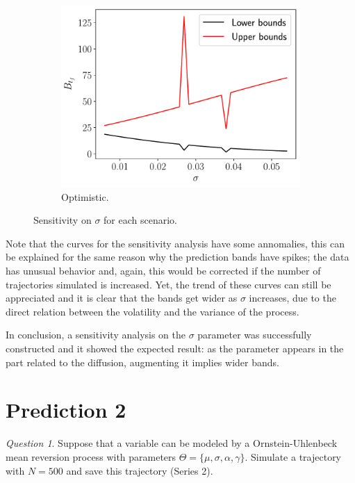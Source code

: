 \documentclass[11pt]{article}
\theoremstyle{definition}
\theoremstyle{remark}
\theoremstyle{remark}
\newtheorem{question}{Question}
\begin{document}
\begin{figure}[t]
\begin{subfigure}[b]{0.45\textwidth}
      \includegraphics[scale=0.45]{sens_optimistic.pdf}
      \caption{Optimistic.}
  \end{subfigure}
  \caption{Sensitivity on $\sigma$ for each scenario.}
  \label{fig:sens1}
\end{figure}

Note that the curves for the sensitivity analysis have some annomalies, this
can be explained for the same reason why the prediction bands have spikes; the
data has unusual behavior and, again, this would be corrected if the number of
trajectories simulated is increased. Yet, the trend of these curves can still
be appreciated and it is clear that the bands get wider as $\sigma$ increases,
due to the direct relation between the volatility and the variance of the
process.

In conclusion, a sensitivity analysis on the $\sigma$ parameter was
successfully constructed and it showed the expected result: as the parameter
appears in the part related to the diffusion, augmenting it implies wider bands.

\section*{Prediction 2}
\begin{question}
  Suppose that a variable can be modeled by a Ornstein-Uhlenbeck mean
  reversion process with parameters
  $\Theta = \{\mu, \sigma, \alpha, \gamma\}$. Simulate a trajectory
  with $N = 500$ and save this trajectory (Series 2).
\end{question}
\end{document}
